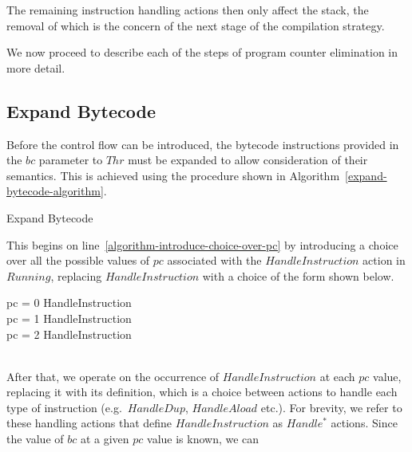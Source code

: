 The remaining instruction handling actions then only affect the stack,
the removal of which is the concern of the next stage of the
compilation strategy.

We now proceed to describe each of the steps of program counter
elimination in more detail.

\FloatBarrier

\subsection{Expand Bytecode}
\label{expand-bytecode-subsection}

Before the control flow can be introduced, the bytecode instructions
provided in the $bc$ parameter to $Thr$ must be expanded to allow
consideration of their semantics.
This is achieved using the procedure shown in
Algorithm~\ref{expand-bytecode-algorithm}.
\begin{algorithm}
  \begin{algorithmic}[1]
    \State {} \label{algorithm-introduce-choice-over-pc}
    \State {} \label{algorithm-collapse-handle-instruction}
    \State {} \label{algorithm-expand-handle-action}
    \EndFor
    \EndProcedure
  \end{algorithmic}
  \caption{Expand Bytecode}
  \label{expand-bytecode-algorithm}
\end{algorithm}
This begins on line~\ref{algorithm-introduce-choice-over-pc} by
introducing a choice over all the possible values of $pc$ associated
with the $HandleInstruction$ action in $Running$, replacing
$HandleInstruction$ with a choice of the form shown below.
\begin{circus}
  \circif pc = 0 \circthen HandleInstruction \\
  {} \circelse pc = 1 \circthen HandleInstruction \\
  {} \circelse pc = 2 \circthen HandleInstruction \\
  {} \cdots {} \\
  \circfi
\end{circus}
After that, we operate on the occurrence of $HandleInstruction$ at
each $pc$ value, replacing it with its definition, which is a choice
between actions to handle each type of instruction (e.g.\ $HandleDup$,
$HandleAload$ etc.).
For brevity, we refer to these handling actions that define
$HandleInstruction$ as $Handle^*$ actions.
Since the value of $bc$ at a given $pc$ value is known, we can
